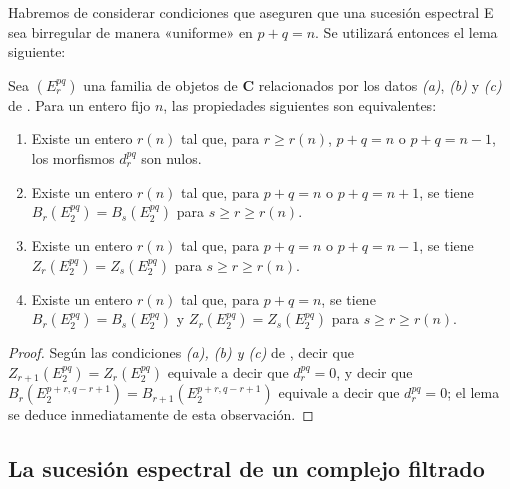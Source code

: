 \begin{env}[11.1.9]
\label{0.11.1.9-fr}
Habremos de considerar condiciones que aseguren que una sucesión espectral E sea birregular de manera «uniforme» en $p+q=n$.
Se utilizará entonces el lema siguiente:
\end{env}

\begin{lemma}[11.1.10]
\label{0.11.1.10}
\label{0.11.1.10-fr}
Sea $(E_r^{pq})$ una familia de objetos de $\mathbf{C}$ relacionados por los datos \emph{(a)}, \emph{(b)} y \emph{(c)} de \textup{}.
Para un entero fijo $n$, las propiedades siguientes son equivalentes:
\begin{enumerate}
  \item[{\rm(a)}] Existe un entero $r(n)$ tal que, para $r\geq r(n)$, $p+q=n$ o $p+q=n-1$, los morfismos $d_r^{pq}$ son nulos.
  \item[{\rm(b)}] Existe un entero $r(n)$ tal que, para $p+q=n$ o $p+q=n+1$, se tiene $B_r(E_2^{pq})=B_s(E_2^{pq})$ para $s\geq r\geq r(n)$.
  \item[{\rm(c)}] Existe un entero $r(n)$ tal que, para $p+q=n$ o $p+q=n-1$, se tiene $Z_r(E_2^{pq})=Z_s(E_2^{pq})$ para $s\geq r\geq r(n)$.
  \item[{\rm(d)}] Existe un entero $r(n)$ tal que, para $p+q=n$, se tiene $B_r(E_2^{pq})=B_s(E_2^{pq})$ y $Z_r(E_2^{pq})=Z_s(E_2^{pq})$ para $s\geq r\geq r(n)$.
\end{enumerate}
\end{lemma}

\begin{proof}
Según las condiciones \emph{(a), (b) y (c)} de , decir que $Z_{r+1}(E_2^{pq})=Z_r(E_2^{pq})$ equivale a decir que $d_r^{pq}=0$, y decir que $B_r(E_2^{p+r,q-r+1})=B_{r+1}(E_2^{p+r,q-r+1})$ equivale a decir que $d_r^{pq}=0$; el lema se deduce inmediatamente de esta observación.
\end{proof}

\subsection{La sucesión espectral de un complejo filtrado}
\label{subsection:0.11.2}
\label{subsection:0.11.2-fr}

